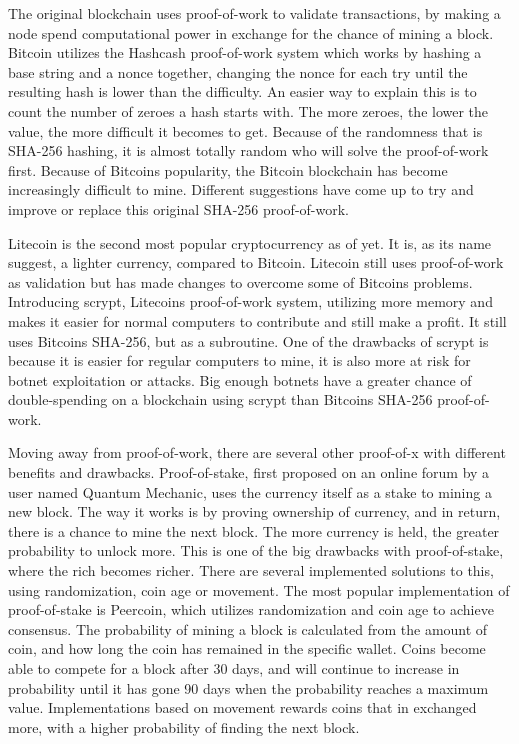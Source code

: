 \documentclass[11pt]{article}
\begin{document}
The original blockchain uses proof-of-work to validate transactions, by making a node spend computational power in exchange for the chance of mining a block. Bitcoin utilizes the Hashcash\cite{hashcash} proof-of-work system which works by hashing a base string and a nonce together, changing the nonce for each try until the resulting hash is lower than the difficulty. An easier way to explain this is to count the number of zeroes a hash starts with. The more zeroes, the lower the value, the more difficult it becomes to get. Because of the randomness that is SHA-256 hashing, it is almost totally random who will solve the proof-of-work first. Because of Bitcoins popularity, the Bitcoin blockchain has become increasingly difficult to mine. Different suggestions have come up to try and improve or replace this original SHA-256 proof-of-work. 

Litecoin is the second most popular cryptocurrency as of yet. It is, as its name suggest, a lighter currency, compared to Bitcoin. Litecoin still uses proof-of-work as validation but has made changes to overcome some of Bitcoins problems. Introducing scrypt, Litecoins proof-of-work system, utilizing more memory and makes it easier for normal computers to contribute and still make a profit. It still uses Bitcoins SHA-256, but as a subroutine. One of the drawbacks of scrypt is because it is easier for regular computers to mine, it is also more at risk for botnet exploitation or attacks. Big enough botnets have a greater chance of double-spending on a blockchain using scrypt than Bitcoins SHA-256 proof-of-work.

Moving away from proof-of-work, there are several other proof-of-x with different benefits and drawbacks. Proof-of-stake, first proposed on an online forum by a user named Quantum Mechanic, uses the currency itself as a stake to mining a new block. The way it works is by proving ownership of currency, and in return, there is a chance to mine the next block. The more currency is held, the greater probability to unlock more. This is one of the big drawbacks with proof-of-stake, where the rich becomes richer. There are several implemented solutions to this, using randomization, coin age or movement. The most popular implementation of proof-of-stake is Peercoin, which utilizes randomization and coin age to achieve consensus. The probability of mining a block is calculated from the amount of coin, and how long the coin has remained in the specific wallet. Coins become able to compete for a block after 30 days, and will continue to increase in probability until it has gone 90 days when the probability reaches a maximum value. Implementations based on movement rewards coins that in exchanged more, with a higher probability of finding the next block. 
\end{document}
